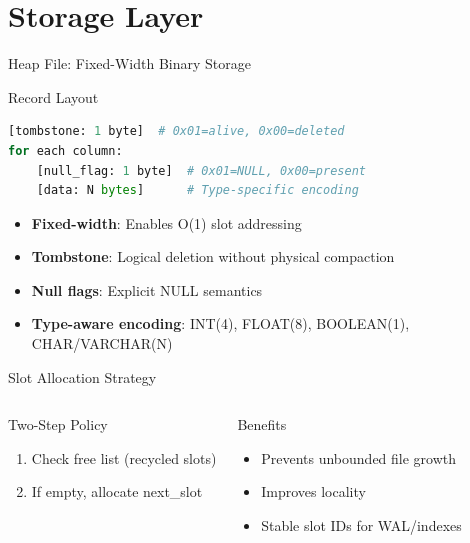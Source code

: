 \documentclass[aspectratio=169]{beamer}
\begin{document}
\section{Storage Layer}

\begin{frame}[fragile]{Heap File: Fixed-Width Binary Storage}
\begin{block}{Record Layout}
\begin{lstlisting}[language=Python]
[tombstone: 1 byte]  # 0x01=alive, 0x00=deleted
for each column:
    [null_flag: 1 byte]  # 0x01=NULL, 0x00=present
    [data: N bytes]      # Type-specific encoding
\end{lstlisting}
\end{block}

\begin{itemize}
  \item \textbf{Fixed-width}: Enables O(1) slot addressing
  \item \textbf{Tombstone}: Logical deletion without physical compaction
  \item \textbf{Null flags}: Explicit NULL semantics
  \item \textbf{Type-aware encoding}: INT(4), FLOAT(8), BOOLEAN(1), CHAR/VARCHAR(N)
\end{itemize}
\end{frame}

\begin{frame}{Slot Allocation Strategy}
\begin{columns}
\begin{block}{Two-Step Policy}
\begin{enumerate}
  \item Check free list (recycled slots)
  \item If empty, allocate next\_slot
\end{enumerate}
\end{block}

\begin{alertblock}{Benefits}
\begin{itemize}
  \item Prevents unbounded file growth
  \item Improves locality
  \item Stable slot IDs for WAL/indexes
\end{itemize}
\end{alertblock}

\begin{center}
\end{center}
\end{columns}
\end{frame}
\end{document}
